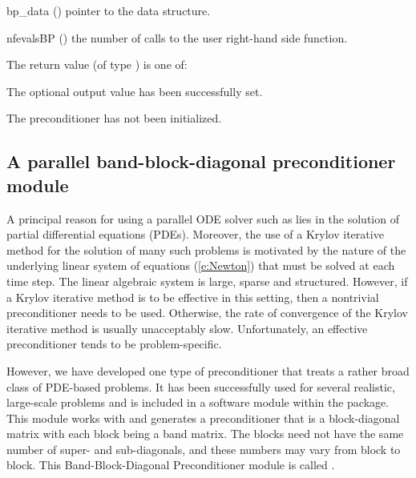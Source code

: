 {
  \begin{args}[nfevalsBP]
  \item[bp\_data] ()
    pointer to the {\cvbandpre} data structure.
  \item[nfevalsBP] ()
    the number of calls to the user right-hand side function.
  \end{args}
}
{
  The return value  (of type ) is one of:
  \begin{args}
  \item[\Id{CV\_SUCCESS}] 
    The optional output value has been successfully set.
  \item[\Id{CV\_PDATA\_NULL}]
    The {\cvbandpre} preconditioner has not been initialized.
  \end{args}
}
{}

\subsection{A parallel band-block-diagonal preconditioner module}
\label{sss:cvbbdpre}

A principal reason for using a parallel ODE solver such as {\cvodes} lies
in the solution of partial differential equations (PDEs).  Moreover,
the use of a Krylov iterative method for the solution of many such
problems is motivated by the nature of the underlying linear system of
equations (\ref{e:Newton}) that must be solved at each time step.  The
linear algebraic system is large, sparse and structured. However, if
a Krylov iterative method is to be effective in this setting, then a
nontrivial preconditioner needs to be used.  Otherwise, the rate of
convergence of the Krylov iterative method is usually unacceptably
slow.  Unfortunately, an effective preconditioner tends to be
problem-specific.

However, we have developed one type of preconditioner that treats a
rather broad class of PDE-based problems.  It has been successfully
used for several realistic, large-scale problems \cite{HiTa:98} and is
included in a software module within the {\cvodes} package. This module
works with {\nvecp} and 
generates a preconditioner that is a block-diagonal matrix with each
block being a band matrix. The blocks need not have the same number of
super- and sub-diagonals, and these numbers may vary from block to
block. This Band-Block-Diagonal Preconditioner module is called
{\cvbbdpre}.

